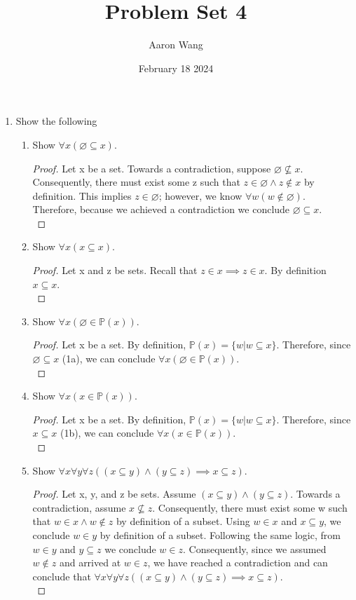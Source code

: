 \documentclass{article}
\title{Problem Set 4}
\author{Aaron Wang}
\date{February 18 2024}
\newcommand{\Emptyset}{\varnothing}
\newcommand{\notsubseteq}{\mathrel{\not\subseteq}}
\begin{document}
\maketitle
\begin{enumerate}
    \item Show the following
    \begin{enumerate}
      \item 
        Show $\forall x (\Emptyset \subseteq x)$.
        \begin{proof}
        Let x be a set. Towards a contradiction, suppose $\Emptyset \notsubseteq x$. Consequently, there must exist some z such that $z\in\Emptyset\land z\notin x$ by definition. This implies $z \in \Emptyset$; however, we know $\forall w (w\notin \Emptyset)$. Therefore, because we achieved a contradiction we conclude $\Emptyset\subseteq x$.\\
        \end{proof}
      \item
        Show $\forall x (x \subseteq x)$.
        \begin{proof}
        Let x and z be sets. Recall that $z \in x \implies z \in x$. By definition $x \subseteq x$.\\
        \end{proof}
      \item
        Show $\forall x (\Emptyset \in \mathbb{P}(x))$.
        \begin{proof}
        Let x be a set. By definition, $\mathbb{P}(x) = \{ w | w \subseteq x\}$. Therefore, since $\Emptyset \subseteq x$ (1a), we can conclude $\forall x (\Emptyset \in \mathbb{P}(x))$.\\
        \end{proof}
      \item
        Show $\forall x (x \in \mathbb{P}(x))$.
        \begin{proof}
        Let x be a set. By definition, $\mathbb{P}(x) = \{ w | w \subseteq x\}$. Therefore, since $x \subseteq x$ (1b), we  can conclude $\forall x (x \in \mathbb{P}(x))$.\\
        \end{proof}
      \item
        Show $\forall x \forall y \forall z ((x \subseteq y) \land (y \subseteq z) \implies x \subseteq z)$.
        \begin{proof}
        Let x, y, and z be sets. Assume $(x \subseteq y) \land (y \subseteq z)$. Towards a contradiction, assume $x \notsubseteq z$. Consequently, there must exist some w such that $w \in x \land w \notin z$ by definition of a subset. Using $w \in x$ and $x \subseteq y$, we conclude $w \in y$ by definition of a subset. Following the same logic, from $w \in y$ and $y \subseteq z$ we conclude $w \in z$. Consequently, since we assumed $w \notin z$ and arrived at $w \in z$, we have reached a contradiction and can conclude that $\forall x \forall y \forall z ((x \subseteq y) \land (y \subseteq z) \implies x \subseteq z)$.\\

\end{proof}
\end{enumerate}
\end{enumerate}
\end{document}
